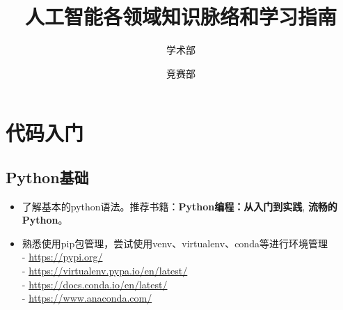 \documentclass[lang=cn,11pt,a4paper]{elegant_template}
\title{人工智能各领域知识脉络和学习指南}
\institute{浙江大学学生人工智能协会}
\author{学术部 \and 竞赛部}
\date{\zhtoday}
\begin{document}
\maketitle


\section{代码入门}
\subsection{Python基础}
\begin{itemize}
\item 了解基本的python语法。推荐书籍：\textbf{Python编程：从入门到实践}, \textbf{流畅的Python}。
\item 熟悉使用pip包管理，尝试使用venv、virtualenv、conda等进行环境管理 \\
  - \href{https://pypi.org/}{https://pypi.org/} \\
  - \href{https://virtualenv.pypa.io/en/latest/}{https://virtualenv.pypa.io/en/latest/} \\
  - \href{https://docs.conda.io/en/latest/}{https://docs.conda.io/en/latest/} \\
  - \href{https://www.anaconda.com/}{https://www.anaconda.com/} \\
\end{itemize}
\end{document}
